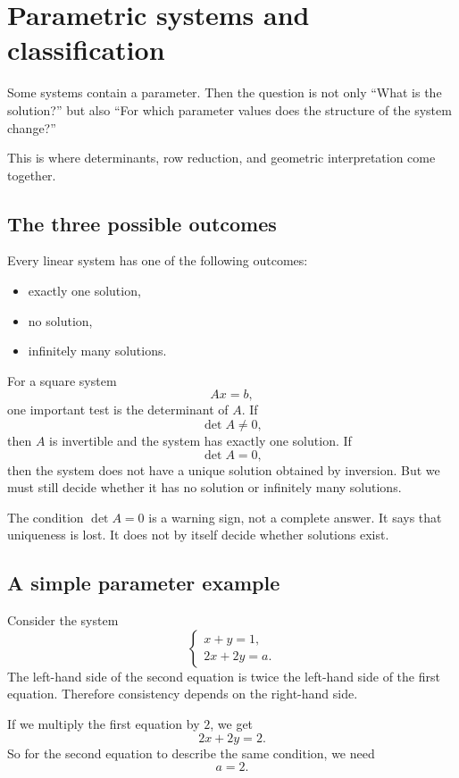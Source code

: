 \section{Parametric systems and classification}

Some systems contain a parameter. Then the question is not only ``What is the solution?'' but also ``For which parameter values does the structure of the system change?''

This is where determinants, row reduction, and geometric interpretation come together.

\subsection*{The three possible outcomes}

Every linear system has one of the following outcomes:
\begin{itemize}
\item exactly one solution,
\item no solution,
\item infinitely many solutions.
\end{itemize}

For a square system
\[
Ax=b,
\]
one important test is the determinant of \(A\). If
\[
\det A\ne0,
\]
then \(A\) is invertible and the system has exactly one solution. If
\[
\det A=0,
\]
then the system does not have a unique solution obtained by inversion. But we must still decide whether it has no solution or infinitely many solutions.

\begin{remarkbox}
The condition \(\det A=0\) is a warning sign, not a complete answer. It says that uniqueness is lost. It does not by itself decide whether solutions exist.
\end{remarkbox}

\subsection*{A simple parameter example}

Consider the system
\[
\begin{cases}
x+y=1,\\
2x+2y=a.
\end{cases}
\]
The left-hand side of the second equation is twice the left-hand side of the first equation. Therefore consistency depends on the right-hand side.

If we multiply the first equation by \(2\), we get
\[
2x+2y=2.
\]
So for the second equation to describe the same condition, we need
\[
a=2.
\]

